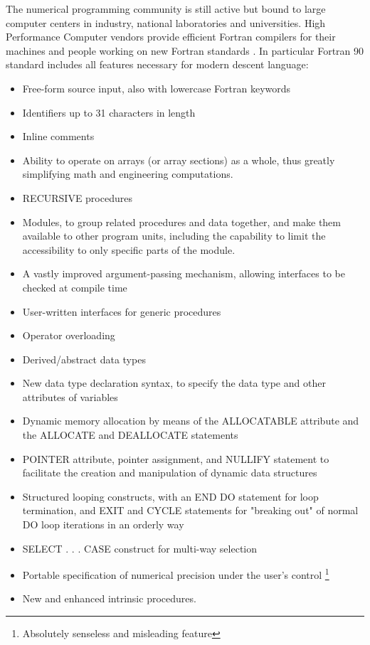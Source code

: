 \documentclass[a4paper]{article}
\begin{document}
    The numerical programming community is still active but bound to large computer centers in industry, national laboratories and universities. High Performance Computer vendors provide efficient Fortran compilers for their machines and people working on new Fortran standards \cite{f90-epl}. In particular Fortran 90 standard includes all features necessary for modern descent language:
\begin {itemize}
    \item Free-form source input, also with lowercase Fortran keywords
    \item Identifiers up to 31 characters in length
    \item Inline comments
    \item Ability to operate on arrays (or array sections) as a whole, thus greatly simplifying math and engineering computations.
 
    \item RECURSIVE procedures
    \item Modules, to group related procedures and data together, and make them available to other program units, including the capability to limit the accessibility to only specific parts of the module.
    \item A vastly improved argument-passing mechanism, allowing interfaces to be checked at compile time
    \item User-written interfaces for generic procedures
    \item Operator overloading
    \item Derived/abstract data types
    \item New data type declaration syntax, to specify the data type and other attributes of variables
    \item Dynamic memory allocation by means of the ALLOCATABLE attribute and the ALLOCATE and DEALLOCATE statements
    \item POINTER attribute, pointer assignment, and NULLIFY statement to facilitate the creation and manipulation of dynamic data structures
    \item Structured looping constructs, with an END DO statement for loop termination, and EXIT and CYCLE statements for "breaking out" of normal DO loop iterations in an orderly way
    \item SELECT . . . CASE construct for multi-way selection
    \item Portable specification of numerical precision under the user's control \footnote {Absolutely senseless and misleading feature} 
    \item New and enhanced intrinsic procedures.
\end {itemize}
\end{document}
